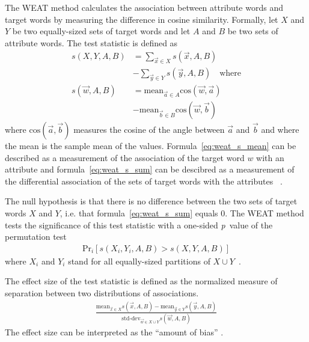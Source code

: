 The WEAT method calculates the association between attribute words and target words
by measuring the difference in cosine similarity. Formally, 
let $X$ and $Y$ be two equally-sized sets of target words and let $A$ and $B$ be two
sets of attribute words. The test statistic is defined as
\begin{align} \label{eq:weat_s_sum}
    \textstyle s(X,Y,A,B) &= \displaystyle\sum_{\vec{x} \in X} s(\vec{x},A,B)\nonumber \\
                          &- \displaystyle\sum_{\vec{y} \in Y} s(\vec{y},A,B)\quad\text{where}\\
\label{eq:weat_s_mean}
    s(\vec{w},A,B) &= \text{mean}_{\vec{a} \in A} \text{cos}(\vec{w}, \vec{a})
            \nonumber\\
                   &- \text{mean}_{\vec{b} \in B} \text{cos}(\vec{w}, \vec{b})
\end{align}
where $\text{cos}(\overrightarrow{a}, \overrightarrow{b})$ measures the cosine of the angle
between $\vec{a}$ and $\vec{b}$ and where the mean is the sample mean of the values.
Formula~\eqref{eq:weat_s_mean} can be described as a measurement of the association of the
target word $w$ with
an attribute and formula~\eqref{eq:weat_s_sum} can be descibred as a measurement of the
differential association of the sets of target words with the attributes~ 
\parencite{caliskan_2017_semantics_language_corpora}.

The null hypothesis is that there is no difference between the two sets of target words $X$
and $Y$, i.e. that formula~\eqref{eq:weat_s_sum} equals $0$.
The WEAT method tests the significance of this test statistic with a one-sided
\emph{p}~value of the permutation test
\begin{align} \label{eq:weat_p_test}
    \text{Pr}_i[s(X_i,Y_i,A,B) > s(X,Y,A,B)]
\end{align}
where $X_i$ and $Y_i$ stand for all equally-sized partitions of
$X \cup Y$~\parencite{caliskan_2017_semantics_language_corpora}.

The effect size of the test statistic is defined as the normalized measure of separation
between two distributions of associations.
\begin{align} \label{eq:weat_effect_size}
\frac{
    \text{mean}_{\vec{x} \in X} s(\vec{x}, A, B) - \text{mean}_{\vec{y} \in Y} s(\vec{y}, A, B)
}{
\text{std-dev}_{\vec{w} \in X \cup Y} s(\vec{w},A,B)
}
\end{align}
The effect size can be interpreted as the ``amount of bias'' \parencite{lauscher-glavas-2019-consistently}.

